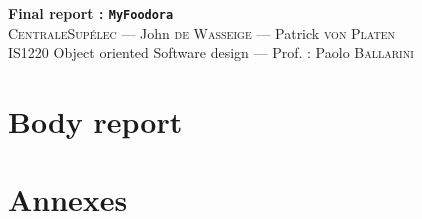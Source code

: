 \documentclass[12pt,oneside,a4paper]{article}
\begin{document}
\begin{center}
{\LARGE \bfseries 
  Final report : \texttt{MyFoodora}\\[0.1cm] 
}
{\large
  \textsc{CentraleSupélec} --- John \textsc{de Wasseige} --- Patrick \textsc{von Platen}\\[0.3cm]
}
{\normalsize
  IS1220 Object oriented Software design --- Prof. : Paolo \textsc{Ballarini} \\[0.9cm]
}
\end{center}

{\hypersetup{linkcolor=black} \tableofcontents}
\newpage

\part{Body report}
 
\newpage
 
\newpage
 
\newpage
 
\newpage
 
\newpage
 
\newpage

\newpage

\part{Annexes}
\appendix

\newpage

\newpage


\end{document}
